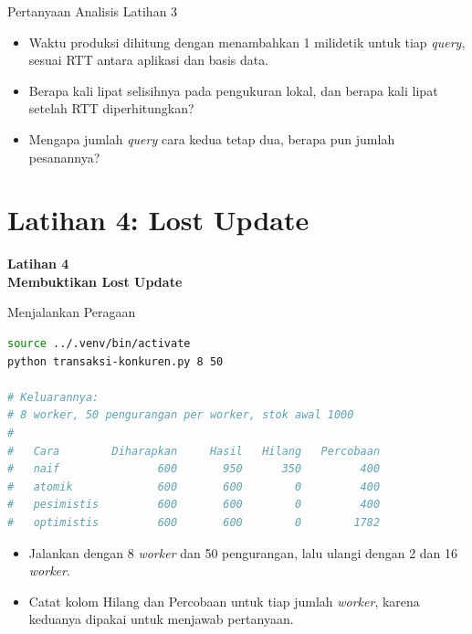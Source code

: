 \documentclass[aspectratio=169, table, 12pt]{beamer}
\begin{document}
\begin{frame}{{\Large Pertanyaan Analisis Latihan 3}}
  \vspace{10pt}
  \begin{itemize}
    \item Waktu produksi dihitung dengan menambahkan 1 milidetik untuk tiap
          \textit{query}, sesuai RTT antara aplikasi dan basis data.
    \item Berapa kali lipat selisihnya pada pengukuran lokal, dan berapa kali
          lipat setelah RTT diperhitungkan?
    \item Mengapa jumlah \textit{query} cara kedua tetap dua, berapa pun jumlah
          pesanannya?
  \end{itemize}
\end{frame}

\section{Latihan 4: Lost Update}

\begin{frame}{\hfill}
  \centering
  \Huge{\textbf{Latihan 4\\Membuktikan Lost Update}}
\end{frame}

\begin{frame}[fragile]{{\Large Menjalankan Peragaan}}
  \vspace{2pt}
\begin{lstlisting}[language=bash]
source ../.venv/bin/activate
python transaksi-konkuren.py 8 50

# Keluarannya:
# 8 worker, 50 pengurangan per worker, stok awal 1000
#
#   Cara        Diharapkan     Hasil   Hilang   Percobaan
#   naif               600       950      350         400
#   atomik             600       600        0         400
#   pesimistis         600       600        0         400
#   optimistis         600       600        0        1782
\end{lstlisting}

  \vspace{2pt}
  \begin{itemize}
    \item Jalankan dengan 8 \textit{worker} dan 50 pengurangan, lalu ulangi dengan 2
          dan 16 \textit{worker}.
    \item Catat kolom Hilang dan Percobaan untuk tiap jumlah
          \textit{worker}, karena keduanya dipakai untuk menjawab pertanyaan.
  \end{itemize}
\end{frame}
\end{document}
